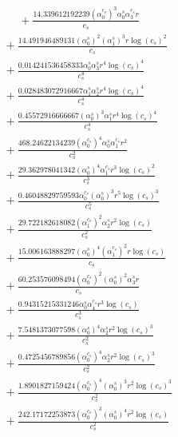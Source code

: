 \documentclass[10pt]{article}
\begin{document}
\begin{align*}
\phantom{R_{3,9}} &\phantom{={}}{}  + \frac{14.339612192239 \left(\alpha_{0}^{c_s}\right)^{3} \alpha_{0}^s \alpha_{3}^{c_s} r}{c_{s}} \\
&{}  + \frac{14.491946489131 \left(\alpha_{0}^s\right)^{2} \left(\alpha_{1}^s\right)^{3} r \log{\left(c_{s} \right)}^{2}}{c_{s}} \\
&{}  + \frac{0.014241536458333 \alpha_{0}^s \alpha_{3}^s r^{4} \log{\left(c_{s} \right)}^{4}}{c_{s}^{4}} \\
&{}  + \frac{0.028483072916667 \alpha_{1}^s \alpha_{2}^s r^{4} \log{\left(c_{s} \right)}^{4}}{c_{s}^{4}} \\
&{}  + \frac{0.45572916666667 \left(\alpha_{0}^s\right)^{3} \alpha_{1}^s r^{4} \log{\left(c_{s} \right)}^{4}}{c_{s}^{4}} \\
&{}  + \frac{468.24622134239 \left(\alpha_{0}^{c_s}\right)^{4} \alpha_{0}^s \alpha_{1}^{c_s} r^{2}}{c_{s}^{2}} \\
&{}  + \frac{29.362978041342 \left(\alpha_{0}^s\right)^{4} \alpha_{1}^{c_s} r^{3} \log{\left(c_{s} \right)}^{2}}{c_{s}^{3}} \\
&{}  + \frac{0.46048829759593 \alpha_{0}^{c_s} \left(\alpha_{0}^s\right)^{3} r^{5} \log{\left(c_{s} \right)}^{3}}{c_{s}^{5}} \\
&{}  + \frac{29.722182618082 \left(\alpha_{1}^{c_s}\right)^{2} \alpha_{2}^s r^{2} \log{\left(c_{s} \right)}}{c_{s}^{2}} \\
&{}  + \frac{15.006163888297 \left(\alpha_{0}^s\right)^{4} \left(\alpha_{1}^{c_s}\right)^{2} r \log{\left(c_{s} \right)}}{c_{s}} \\
&{}  + \frac{60.253576098494 \left(\alpha_{0}^{c_s}\right)^{2} \left(\alpha_{0}^s\right)^{2} \alpha_{3}^s r}{c_{s}} \\
&{}  + \frac{0.94315215331246 \alpha_{0}^s \alpha_{4}^{c_s} r^{3} \log{\left(c_{s} \right)}}{c_{s}^{3}} \\
&{}  + \frac{7.5481373077598 \left(\alpha_{0}^s\right)^{4} \alpha_{2}^s r^{2} \log{\left(c_{s} \right)}^{3}}{c_{s}^{2}} \\
&{}  + \frac{0.4725456789856 \left(\alpha_{0}^{c_s}\right)^{4} \alpha_{2}^s r^{2} \log{\left(c_{s} \right)}^{3}}{c_{s}^{2}} \\
&{}  + \frac{1.8901827159424 \left(\alpha_{0}^{c_s}\right)^{4} \left(\alpha_{0}^s\right)^{3} r^{2} \log{\left(c_{s} \right)}^{3}}{c_{s}^{2}} \\
&{}  + \frac{242.17172253873 \left(\alpha_{0}^{c_s}\right)^{3} \left(\alpha_{0}^s\right)^{4} r^{2} \log{\left(c_{s} \right)}}{c_{s}^{2}} \\

\end{align*}
\end{document}
